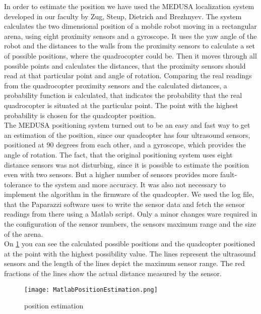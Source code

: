 In order to estimate the position we have used the MEDUSA localization system developed in our faculty by Zug, Steup, Dietrich and Brezhnyev\cite{Zug2011RobLoc}. 
The system calculates the two dimensional position of a mobile robot moving in a rectangular arena, using eight proximity sensors and a gyroscope. 
It uses the yaw angle of the robot and the distances to the walls from the proximity sensors to calculate a set of possible positions, where the quadrocopter could be. 
Then it moves through all possible points and calculates the distances, that the proximity sensors should read at that particular point and angle of rotation. 
Comparing the real readings from the quadrocopter proximity sensors and the calculated distances, a probability function is calculated, that indicates the probability that the real quadrocopter is situated at the particular point. 
The point with the highest probability is chosen for the quadcopter position.\\

The MEDUSA positioning system turned out to be an easy and fast way to get an estimation of the position, since our quadcopter has four ultrasound sensors, positioned at 90 degrees from each other, and a gyroscope, which provides the angle of rotation. 
The fact, that the original positioning system uses eight distance sensors was not disturbing, since it is possible to estimate the position even with two sensors. 
But a higher number of sensors provides more fault-tolerance to the system and more accuracy. 
It was also not necessary to implement the algorithm in the firmware of the quadcopter. 
We used the log file, that the Paparazzi software uses to write the sensor data and fetch the sensor readings from there using a Matlab script. 
Only a minor changes ware required in the configuration of the sensor numbers, the sensors maximum range and the size of the arena.\\

On \ref{fig:matlabPosEstimation} you can see the calculated possible positions and the quadcopter positioned at the point with the highest possibility value. 
The lines represent the ultrasound sensors and the length of the lines depict the maximum sensor range. 
The red fractions of the lines show the actual distance measured by the sensor. 

\begin{figure}[h!]
 \begin{center}
  \texttt{[image: MatlabPositionEstimation.png]}
 \end{center}
  \caption{position estimation\label{fig:matlabPosEstimation}}
\end{figure}

